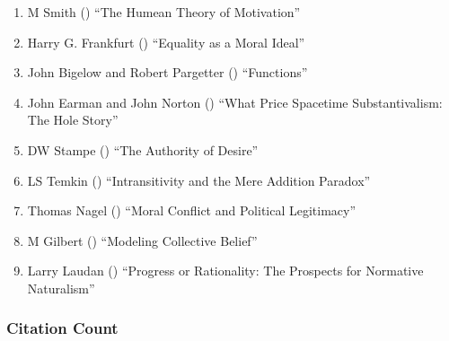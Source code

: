 \documentclass[
  10pt,
  letterpaper,
  DIV=11,
  numbers=noendperiod,
  twoside]{scrartcl}
\providecommand{\tightlist}{%
  \setlength{\itemsep}{0pt}\setlength{\parskip}{0pt}}\usepackage{longtable,booktabs,array}
\begin{document}
\begin{enumerate}
\def\labelenumi{\arabic{enumi}.}
\tightlist
\item
  M Smith () ``The Humean Theory
  of Motivation''
\item
  Harry G. Frankfurt ()
  ``Equality as a Moral Ideal''
\item
  John Bigelow and Robert Pargetter
  () ``Functions''
\item
  John Earman and John Norton ()
  ``What Price Spacetime Substantivalism: The Hole Story''
\item
  DW Stampe () ``The Authority of
  Desire''
\item
  LS Temkin () ``Intransitivity
  and the Mere Addition Paradox''
\item
  Thomas Nagel () ``Moral
  Conflict and Political Legitimacy''
\item
  M Gilbert () ``Modeling
  Collective Belief''
\item
  Larry Laudan () ``Progress or
  Rationality: The Prospects for Normative Naturalism''
\end{enumerate}

\subsubsection*{Citation Count}\label{sec-count-1987}
\end{document}
